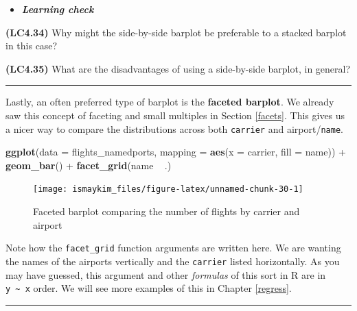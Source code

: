 \documentclass[]{tufte-book}
\newenvironment{Shaded}{\begin{snugshade}}{\end{snugshade}}
\newcommand{\KeywordTok}[1]{\textcolor[rgb]{0.13,0.29,0.53}{\textbf{{#1}}}}
\newcommand{\DataTypeTok}[1]{\textcolor[rgb]{0.13,0.29,0.53}{{#1}}}
\newcommand{\StringTok}[1]{\textcolor[rgb]{0.31,0.60,0.02}{{#1}}}
\newcommand{\NormalTok}[1]{{#1}}
\let\oldrule=\rule
\renewcommand{\rule}[1]{\oldrule{\linewidth}}
\newenvironment{rmdblock}[1]
  {\begin{shaded*}
  \begin{itemize}
  \renewcommand{\labelitemi}{
    \raisebox{-.7\height}[0pt][0pt]{
    }
  }
  \item
  }
  {
  \end{itemize}
  \end{shaded*}
  }
\newenvironment{learncheck}
  {\begin{rmdblock}{warning}}
  {\end{rmdblock}}
\theoremstyle{definition}
\theoremstyle{definition}
\theoremstyle{remark}
\begin{document}
\begin{learncheck}
\textbf{\emph{Learning check}}
\end{learncheck}

\textbf{(LC4.34)} Why might the side-by-side barplot be preferable to a
stacked barplot in this case?

\textbf{(LC4.35)} What are the disadvantages of using a side-by-side
barplot, in general?

\begin{center}\rule{0.5\linewidth}{\linethickness}\end{center}

Lastly, an often preferred type of barplot is the \textbf{faceted
barplot}. We already saw this concept of faceting and small multiples in
Section \ref{facets}. This gives us a nicer way to compare the
distributions across both \texttt{carrier} and airport/\texttt{name}.

\begin{Shaded}
\begin{Highlighting}[]
\KeywordTok{ggplot}\NormalTok{(}\DataTypeTok{data =} \NormalTok{flights_namedports, }\DataTypeTok{mapping =} \KeywordTok{aes}\NormalTok{(}\DataTypeTok{x =} \NormalTok{carrier, }\DataTypeTok{fill =} \NormalTok{name)) +}
\StringTok{  }\KeywordTok{geom_bar}\NormalTok{() +}
\StringTok{  }\KeywordTok{facet_grid}\NormalTok{(name ~}\StringTok{ }\NormalTok{.)}
\end{Highlighting}
\end{Shaded}

\begin{figure}

{\centering \texttt{[image: ismaykim\_files/figure-latex/unnamed-chunk-30-1]} 

}

\caption[Faceted barplot comparing the number of flights by carrier and airport]{Faceted barplot comparing the number of flights by carrier and airport}\label{fig:unnamed-chunk-30}
\end{figure}

Note how the \texttt{facet\_grid} function arguments are written here.
We are wanting the names of the airports vertically and the
\texttt{carrier} listed horizontally. As you may have guessed, this
argument and other \emph{formulas} of this sort in R are in
\texttt{y\ \textasciitilde{}\ x} order. We will see more examples of
this in Chapter \ref{regress}.

\begin{center}\rule{0.5\linewidth}{\linethickness}\end{center}
\end{document}
